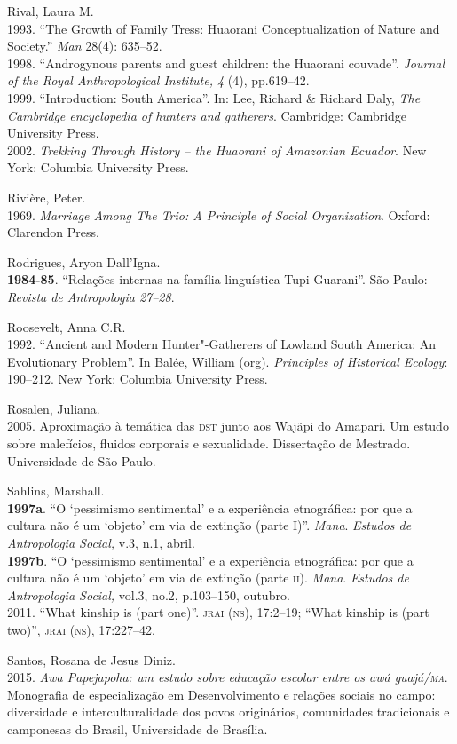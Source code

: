 \begin{bibliohedra}
Rival, Laura M.\\
1993. ``The Growth of Family Tress: Huaorani Conceptualization
of Nature and Society.'' \emph{Man} 28(4): 635--52.\\
1998. ``Androgynous parents and guest children: the Huaorani
couvade''. \emph{Journal of the Royal Anthropological Institute, 4} (4),
pp.619--42.\\
1999. ``Introduction: South America''. In: Lee, Richard \& Richard
Daly, \emph{The Cambridge encyclopedia of hunters and gatherers}.
Cambridge: Cambridge University Press.\\
2002. \emph{Trekking Through History -- the Huaorani of
Amazonian Ecuador}. New York: Columbia University Press.

Rivière, Peter.\\
1969. \emph{Marriage Among The Trio: A Principle of Social
Organization}. Oxford: Clarendon Press.

Rodrigues, Aryon Dall'Igna.\\
\textbf{1984-85}. ``Relações internas na família linguística Tupi
Guarani''. São Paulo: \emph{Revista de Antropologia 27--28}.

Roosevelt, Anna C.R.\\
1992. ``Ancient and Modern Hunter"-Gatherers of Lowland South
America: An Evolutionary Problem''. In Balée, William (org).
\emph{Principles of Historical Ecology}: 190--212. New York: Columbia
University Press.

Rosalen, Juliana.\\
2005. Aproximação à temática das \textsc{dst} junto aos Wajãpi do
Amapari. Um estudo sobre malefícios, fluidos corporais e sexualidade.
Dissertação de Mestrado. Universidade de São Paulo.

Sahlins, Marshall.\\
\textbf{1997a}. ``O `pessimismo sentimental' e a experiência
etnográfica: por que a cultura não é um `objeto' em via de extinção
(parte I)''. \emph{Mana}. \emph{Estudos de Antropologia Social,} v.3,
n.1, abril.\\
\textbf{1997b}. ``O `pessimismo sentimental' e a experiência
etnográfica: por que a cultura não é um `objeto' em via de extinção
(parte \textsc{ii}). \emph{Mana}. \emph{Estudos de Antropologia Social,} vol.3,
no.2, p.103--150, outubro.\\
2011. ``What kinship is (part one)''. \textsc{jrai} (\textsc{ns}), 17:2--19;
``What kinship is (part two)'', \textsc{jrai} (\textsc{ns}), 17:227--42.

Santos, Rosana de Jesus Diniz.\\
2015. \emph{Awa Papejapoha: um estudo sobre educação escolar
entre os awá guajá/\textsc{ma}}. Monografia de especialização em Desenvolvimento
e relações sociais no campo: diversidade e interculturalidade dos povos
originários, comunidades tradicionais e camponesas do Brasil,
Universidade de Brasília.


\end{bibliohedra}
